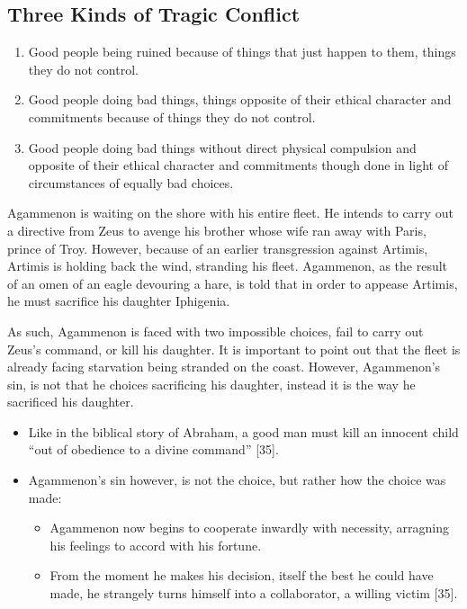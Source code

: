 \documentclass[
  letterpaper,
  DIV=11,
  numbers=noendperiod]{scrreprt}
\providecommand{\tightlist}{%
  \setlength{\itemsep}{0pt}\setlength{\parskip}{0pt}}\usepackage{longtable,booktabs,array}
\begin{document}
\begin{tcolorbox}[enhanced jigsaw, arc=.35mm, breakable, rightrule=.15mm, colback=white, colframe=quarto-callout-important-color-frame, bottomrule=.15mm, leftrule=.75mm, opacityback=0, toprule=.15mm, left=2mm]
\begin{tcolorbox}[enhanced jigsaw, arc=.35mm, breakable, rightrule=.15mm, colback=white, colframe=quarto-callout-tip-color-frame, bottomrule=.15mm, leftrule=.75mm, opacityback=0, toprule=.15mm, left=2mm]
\section{Three Kinds of Tragic
Conflict}\label{three-kinds-of-tragic-conflict}

\begin{enumerate}
\def\labelenumi{\arabic{enumi}.}
\tightlist
\item
  Good people being ruined because of things that just happen to them,
  things they do not control.
\item
  Good people doing bad things, things opposite of their ethical
  character and commitments because of things they do not control.
\item
  Good people doing bad things without direct physical compulsion and
  opposite of their ethical character and commitments though done in
  light of circumstances of equally bad choices.
\end{enumerate}

Agammenon is waiting on the shore with his entire fleet. He intends to
carry out a directive from Zeus to avenge his brother whose wife ran
away with Paris, prince of Troy. However, because of an earlier
transgression against Artimis, Artimis is holding back the wind,
stranding his fleet. Agammenon, as the result of an omen of an eagle
devouring a hare, is told that in order to appease Artimis, he must
sacrifice his daughter Iphigenia.

As such, Agammenon is faced with two impossible choices, fail to carry
out Zeus's command, or kill his daughter. It is important to point out
that the fleet is already facing starvation being stranded on the coast.
However, Agammenon's sin, is not that he choices sacrificing his
daughter, instead it is the way he sacrificed his daughter.

\begin{itemize}
\tightlist
\item
  Like in the biblical story of Abraham, a good man must kill an
  innocent child ``out of obedience to a divine command'' {[}35{]}.
\item
  Agammenon's sin however, is not the choice, but rather how the choice
  was made:

  \begin{itemize}
  \tightlist
  \item
    Agammenon now begins to cooperate inwardly with necessity, arragning
    his feelings to accord with his fortune.
  \item
    From the moment he makes his decision, itself the best he could have
    made, he strangely turns himself into a collaborator, a willing
    victim {[}35{]}.
  \end{itemize}
\end{itemize}


\end{tcolorbox}
\end{tcolorbox}
\end{document}
